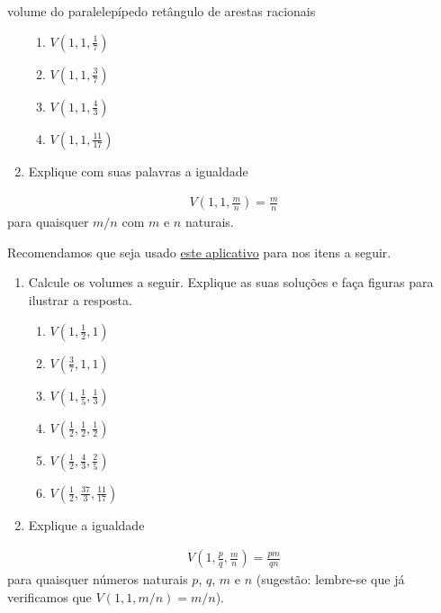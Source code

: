 \begin{task}{volume do paralelepípedo retângulo de arestas racionais}
\begin{enumerate}
\begin{enumerate}
\item {} 
\(V\left(1, 1, \frac{1}{7}\right)\)

\item {} 
\(V\left(1, 1, \frac{3}{7}\right)\)

\item {} 
\(V \left(1, 1, \frac{4}{3}\right)\)

\item {} 
\(V \left(1, 1, \frac{11}{17}\right)\)

\end{enumerate}

\item {} 
Explique com suas palavras a igualdade

\end{enumerate}
\begin{equation*}
\begin{split}\displaystyle{V \left( 1,1,\frac{m}{n} \right) = \frac{m}{n}}\end{split}
\end{equation*}
para quaisquer \(m/n\) com \(m\) e \(n\) naturais.

Recomendamos que seja usado \href{https://ggbm.at/zfaaqbr7}{este aplicativo} para nos itens a seguir.
\begin{enumerate}
\item {} 
Calcule os volumes a seguir. Explique as suas soluções e faça figuras para ilustrar a resposta.
\begin{enumerate}
\item {} 
\(V\left(1,\frac{1}{2},1\right)\)

\item {} 
\(V\left(\frac{3}{7}, 1, 1\right)\)

\item {} 
\(V\left(1,\frac{1}{5},\frac{1}{3}\right)\)

\item {} 
\(V\left(\frac{1}{2},\frac{1}{2},\frac{1}{2}\right)\)

\item {} 
\(V\left(\frac{1}{2},\frac{4}{3},\frac{2}{5}\right)\)

\item {} 
\(V\left(\frac{1}{2},\frac{37}{3},\frac{11}{17}\right)\)

\end{enumerate}

\item {} 
Explique a igualdade

\end{enumerate}
\begin{equation*}
\begin{split}V\left(1, \frac{p}{q}, \frac{m}{n}\right) = \frac{pm}{qn}\end{split}
\end{equation*}
para quaisquer números naturais \(p\), \(q\), \(m\) e \(n\) (sugestão: lembre-se que já verificamos que \(V(1, 1, m/n) = m/n\)).


\end{task}
